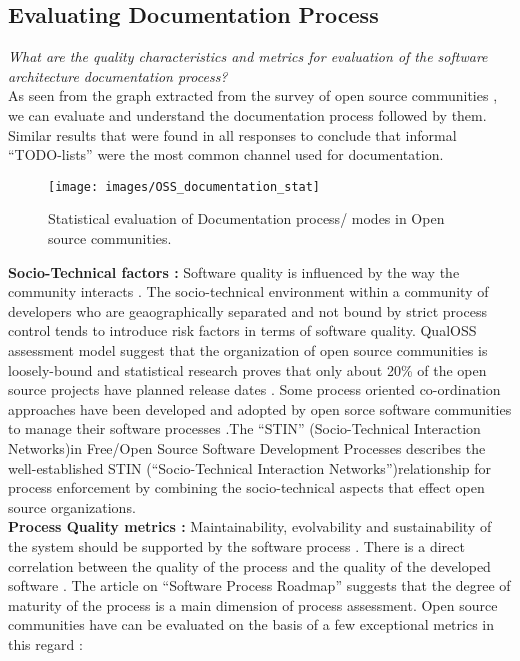 \subsection{Evaluating Documentation Process}
\indent \emph{What are the quality characteristics and metrics for evaluation of the software architecture documentation process?}
\\\indent As seen from the graph extracted from the survey of open source communities \cite{Zhao2003}, we can evaluate and understand the documentation process followed by them. Similar results that were found in all responses to conclude that informal \enquote{TODO-lists} were the most common channel used for documentation.
\begin{figure}[H]
  \centering
  \texttt{[image: images/OSS\_documentation\_stat]}
  \caption[Statistical evaluation of Documentation process/ modes in Open source communities]{Statistical evaluation of Documentation process/ modes in Open source communities.}\label{fig:MWDocProc}
\end{figure}
\indent \textbf{Socio-Technical factors : } Software quality is influenced by the way the community interacts \cite{Mens2011}. The socio-technical environment within a community of developers who are geaographically separated and not bound by strict process control tends to introduce risk factors in terms of software quality. QualOSS assessment model \cite{5314237} suggest that the organization of open source communities is loosely-bound and statistical research \cite{Zhao2003} proves that only about 20\% of the open source projects have planned release dates . Some process oriented co-ordination approaches have been developed and adopted by open sorce software communities to manage their software processes .The \enquote{STIN} (Socio-Technical Interaction Networks)in Free/Open Source Software Development Processes \cite{SPM_2005} describes the well-established STIN (\enquote{Socio-Technical Interaction Networks})relationship for process enforcement by combining the socio-technical aspects that effect open source organizations. 
\\\indent \textbf{Process Quality metrics : } Maintainability, evolvability and sustainability of the system should be supported by the software process \cite{BachmannDocumentingSoftware2010} \cite{5314237}. There is a direct correlation between the quality of the process and the quality of the developed software \cite{Fuggeffa1988}. The article on \enquote{Software Process Roadmap} \cite{Fuggeffa1988} suggests that the degree of maturity of the process is a main dimension of process assessment. Open source communities have can be evaluated on the basis of a few exceptional metrics in this regard \cite{Zhao2003} :
